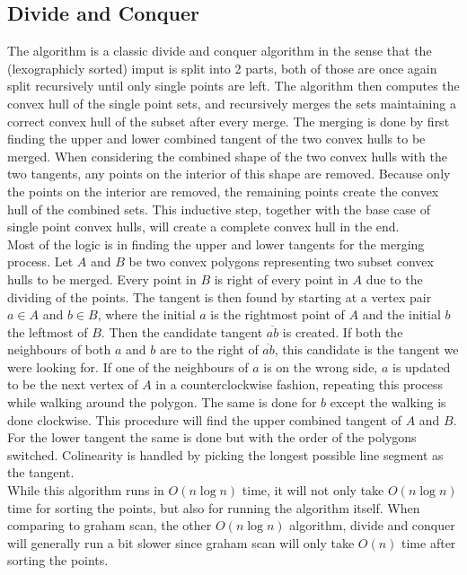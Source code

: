 \documentclass{article}
\begin{document}
\subsection*{Divide and Conquer}
The algorithm is a classic divide and conquer algorithm in the sense that the (lexographicly sorted) imput is split into 2 parts, both of those are once again split recursively until only single points are left.
The algorithm then computes the convex hull of the single point sets, and recursively merges the sets maintaining a correct convex hull of the subset after every merge.
The merging is done by first finding the upper and lower combined tangent of the two convex hulls to be merged.
When considering the combined shape of the two convex hulls with the two tangents, any points on the interior of this shape are removed.
Because only the points on the interior are removed, the remaining points create the convex hull of the combined sets.
This inductive step, together with the base case of single point convex hulls, will create a complete convex hull in the end.
\\
Most of the logic is in finding the upper and lower tangents for the merging process.
Let $A$ and $B$ be two convex polygons representing two subset convex hulls to be merged. Every point in $B$ is right of every point in $A$ due to the dividing of the points.
The tangent is then found by starting at a vertex pair $a \in A$ and $b \in B$, where the initial $a$ is the rightmost point of $A$ and the initial $b$ the leftmost of $B$. 
Then the candidate tangent $\overline{ab}$ is created.
If both the neighbours of both $a$ and $b$ are to the right of $\overline{ab}$, this candidate is the tangent we were looking for. 
If one of the neighbours of $a$ is on the wrong side, $a$ is updated to be the next vertex of $A$ in a counterclockwise fashion, repeating this process while walking around the polygon. 
The same is done for $b$ except the walking is done clockwise.
This procedure will find the upper combined tangent of $A$ and $B$. For the lower tangent the same is done but with the order of the polygons switched.
Colinearity is handled by picking the longest possible line segment as the tangent.
\\
While this algorithm runs in $O(n\log n)$ time, it will not only take $O(n\log n)$ time for sorting the points, but also for running the algorithm itself.
When comparing to graham scan, the other $O(n\log n)$ algorithm, divide and conquer will generally run a bit slower since graham scan will only take $O(n)$ time after sorting the points.
\end{document}
